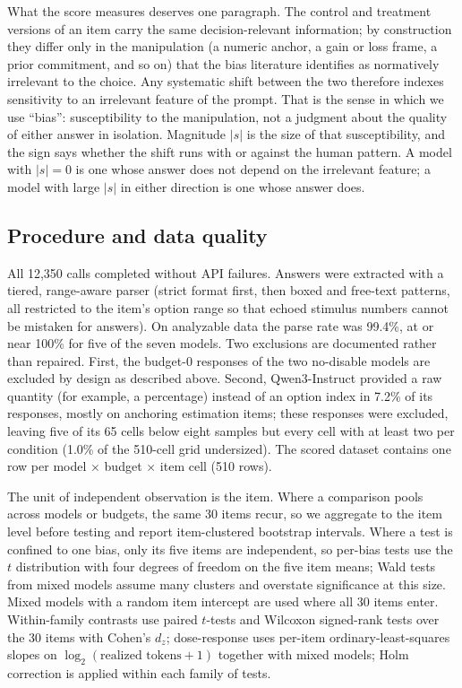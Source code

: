 \documentclass[conference]{IEEEtran}
\begin{document}
What the score measures deserves one paragraph. The control and treatment versions of an item carry the same decision-relevant information; by construction they differ only in the manipulation (a numeric anchor, a gain or loss frame, a prior commitment, and so on) that the bias literature identifies as normatively irrelevant to the choice. Any systematic shift between the two therefore indexes sensitivity to an irrelevant feature of the prompt. That is the sense in which we use ``bias'': susceptibility to the manipulation, not a judgment about the quality of either answer in isolation. Magnitude $|s|$ is the size of that susceptibility, and the sign says whether the shift runs with or against the human pattern. A model with $|s| = 0$ is one whose answer does not depend on the irrelevant feature; a model with large $|s|$ in either direction is one whose answer does.

\subsection{Procedure and data quality}
All 12,350 calls completed without API failures. Answers were extracted with a tiered, range-aware parser (strict format first, then boxed and free-text patterns, all restricted to the item's option range so that echoed stimulus numbers cannot be mistaken for answers). On analyzable data the parse rate was 99.4\%, at or near 100\% for five of the seven models. Two exclusions are documented rather than repaired. First, the budget-0 responses of the two no-disable models are excluded by design as described above. Second, Qwen3-Instruct provided a raw quantity (for example, a percentage) instead of an option index in 7.2\% of its responses, mostly on anchoring estimation items; these responses were excluded, leaving five of its 65 cells below eight samples but every cell with at least two per condition (1.0\% of the 510-cell grid undersized). The scored dataset contains one row per model $\times$ budget $\times$ item cell (510 rows).

The unit of independent observation is the item. Where a comparison pools across models or budgets, the same 30 items recur, so we aggregate to the item level before testing and report item-clustered bootstrap intervals. Where a test is confined to one bias, only its five items are independent, so per-bias tests use the $t$ distribution with four degrees of freedom on the five item means; Wald tests from mixed models assume many clusters and overstate significance at this size. Mixed models with a random item intercept are used where all 30 items enter. Within-family contrasts use paired $t$-tests and Wilcoxon signed-rank tests over the 30 items with Cohen's $d_z$; dose-response uses per-item ordinary-least-squares slopes on $\log_2(\text{realized tokens}+1)$ together with mixed models; Holm correction is applied within each family of tests.
\end{document}

